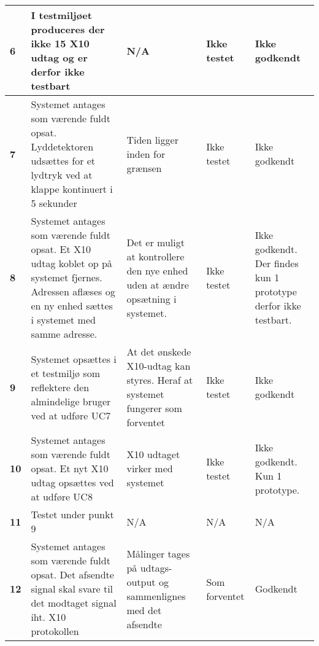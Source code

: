\begin{center}
\begin{longtable}{|p{}|p{}|p{}|p{}|p{}|}
\textbf{6} &
I testmiljøet produceres der ikke 15 X10 udtag og er derfor ikke testbart &
N/A  
&Ikke \newline testet
&Ikke \newline godkendt
 \\\hline

\textbf{7} &
Systemet antages som værende fuldt opsat.\newline
Lyddetektoren udsættes for et lydtryk ved at klappe kontinuert i 5 sekunder &
Tiden ligger inden for grænsen
&Ikke \newline testet
&Ikke \newline godkendt
 \\\hline

\textbf{8} &
Systemet antages som værende fuldt opsat.\newline
Et X10 udtag koblet op på systemet fjernes. Adressen aflæses og en ny enhed sættes i systemet med samme adresse.&
Det er muligt at kontrollere den nye enhed uden at ændre opsætning i systemet.
&Ikke \newline testet
&Ikke \newline godkendt. \newline Der findes kun 1 prototype derfor ikke testbart.
 \\\hline

\textbf{9} &
Systemet opsættes i et testmiljø som reflektere den almindelige bruger ved at udføre UC7&
At det ønskede X10-udtag kan styres. Heraf at systemet fungerer som forventet
&Ikke \newline testet
&Ikke \newline godkendt 
 \\\hline

\textbf{10} &
Systemet antages som værende fuldt opsat.\newline
Et nyt X10 udtag opsættes ved at udføre UC8 &
X10 udtaget virker med systemet
&Ikke \newline testet
&Ikke \newline godkendt. \newline Kun 1 prototype.
 \\\hline

\textbf{11} &
Testet under punkt 9&
N/A &
N/A &
N/A \\\hline

\textbf{12} &
Systemet antages som værende fuldt opsat.\newline
Det afsendte signal skal svare til det modtaget signal iht. X10 protokollen&
Målinger tages på udtags-output og sammenlignes med det afsendte
&Som \newline forventet
&Godkendt
 \\\hline


\end{longtable}
\end{center}
